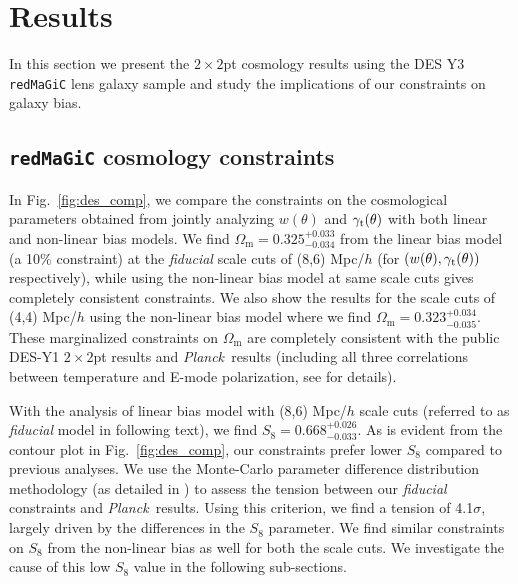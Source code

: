 \documentclass[aps, prd,twocolumn,superscriptaddress,nofootinbib,preprintnumbers]{revtex4-1}
\newcommand{\gammat}{\ensuremath{\gamma_{\rm t}(\theta)}}
\newcommand{\wtheta}{\ensuremath{w(\theta)}}
\newcommand{\om}{\ensuremath{\Omega_{\mathrm m}}}
\newcommand{\redmagic}{\texttt{redMaGiC} }
\newcommand{\Planck}{{\slshape Planck~}}
\begin{document}
\section{Results}
\label{sec:results}
In this section we present the $2\times2$pt cosmology results using the DES Y3 \redmagic lens galaxy sample and study the implications of our constraints on  galaxy bias. 
\subsection{\redmagic cosmology constraints}
\label{sec:fid_cosmo_res}
In Fig.~\ref{fig:des_comp}, we compare the constraints on the cosmological parameters obtained from jointly analyzing $\wtheta$ and $\gammat$ with both linear and non-linear bias models. 
We find $\om = 0.325^{+0.033}_{-0.034}$ from the linear bias model (a 10\% constraint) at the \textit{fiducial} scale cuts of (8,6) Mpc/$h$ (for $(w(\theta),\gamma_{\rm t}(\theta))$ respectively), while using the non-linear bias model at same scale cuts gives completely consistent constraints.
We also show the results for the scale cuts of (4,4) Mpc/$h$ using the non-linear bias model where we find $\om=0.323^{+0.034}_{-0.035}$. These marginalized constraints on $\om$ are completely consistent with the public DES-Y1  $2\times 2$pt results \citep{Abbott_2018} and \Planck results (including all  three correlations between temperature and E-mode polarization, see \citet{Planck_2018_cosmo} for details). 

With the analysis of linear bias model with (8,6) Mpc/$h$ scale cuts (referred to as \textit{fiducial}  model in following text), we find $S_8 = 0.668^{+0.026}_{-0.033}$. As is evident from the contour plot in Fig.~\ref{fig:des_comp}, our constraints prefer lower $S_8$ compared to previous analyses.  We use the Monte-Carlo parameter difference distribution methodology (as detailed in \citet*{y3-tensions}) to assess the tension between our \textit{fiducial} constraints and \Planck results. Using this criterion, we find a tension of 4.1$\sigma$, largely driven by the differences in the $S_8$ parameter. We find similar constraints on $S_8$ from the non-linear bias as well for both the scale cuts. We investigate the cause of this low $S_8$ value in the following sub-sections. 
\end{document}
